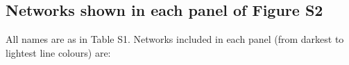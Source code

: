 \documentclass[12pt]{article}
\begin{document}
\begin{spacing}{1.0}
\begin{figure}[!h]
{         %
         }
        \label{within_family_regression}
      \end{figure}


    \subsection*{Networks shown in each panel of Figure S2}

    All names are as in Table S1. Networks included in each panel (from darkest to lightest line colours) are:



\end{spacing}
\end{document}
